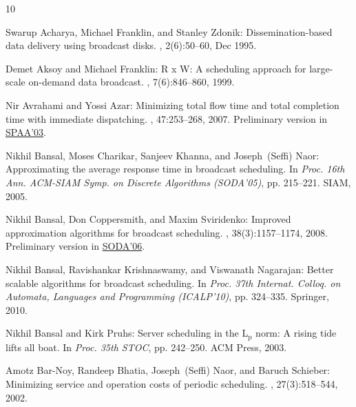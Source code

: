 \tocrefpdfbookmark
\begin{thebibliography}{10}

{\sc Swarup Acharya, Michael Franklin, and Stanley Zdonik}: Dissemination-based
  data delivery using broadcast disks.
, 2(6):50--60, Dec 1995.
\newblock [\epfmtdoi{10.1109/98.475988}]

{\sc Demet Aksoy and Michael Franklin}: {R x W}: A scheduling approach for
  large-scale on-demand data broadcast.
, 7(6):846--860, 1999.
\newblock [\epfmtdoi{10.1109/90.811450}]

{\sc Nir Avrahami and Yossi Azar}: Minimizing total flow time and total
  completion time with immediate dispatching.
, 47:253--268, 2007.
\newblock Preliminary version in
  \href{http://dx.doi.org/10.1145/777412.777415}{SPAA'03}.
\newblock [\epfmtdoi{10.1007/s00453-006-0193-6}]

{\sc Nikhil Bansal, Moses Charikar, Sanjeev Khanna, and Joseph~(Seffi) Naor}:
  Approximating the average response time in broadcast scheduling.
\newblock In {\em Proc. 16th Ann. ACM-SIAM Symp. on Discrete Algorithms
  (SODA'05)}, pp. 215--221. SIAM, 2005.

{\sc Nikhil Bansal, Don Coppersmith, and Maxim Sviridenko}: Improved
  approximation algorithms for broadcast scheduling.
, 38(3):1157--1174, 2008.
\newblock Preliminary version in
  \href{http://dx.doi.org/10.1145/1109557.1109596}{SODA'06}.
\newblock [\epfmtdoi{10.1137/060674417}]

{\sc Nikhil Bansal, Ravishankar Krishnaswamy, and Viswanath Nagarajan}: Better
  scalable algorithms for broadcast scheduling.
\newblock In {\em Proc. 37th Internat. Colloq. on Automata, Languages and
  Programming (ICALP'10)}, pp. 324--335. Springer, 2010.
\newblock [\epfmtdoi{10.1007/978-3-642-14165-2\_28}]

{\sc Nikhil Bansal and Kirk Pruhs}: Server scheduling in the {L$_{\mbox{p}}$}
  norm: A rising tide lifts all boat.
\newblock In {\em Proc. 35th STOC}, pp. 242--250. ACM Press, 2003.
\newblock [\epfmtdoi{10.1145/780542.780580}]

{\sc Amotz Bar-Noy, Randeep Bhatia, Joseph~(Seffi) Naor, and Baruch Schieber}:
  Minimizing service and operation costs of periodic scheduling.
, 27(3):518--544, 2002.


\end{thebibliography}
